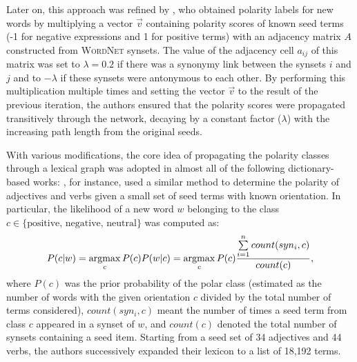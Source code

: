 Later on, this approach was refined by \citet{Blair-Goldensohn:08},
who obtained polarity labels for new words by multiplying a vector
$\vec{v}$ containing polarity scores of known seed terms (-1 for
negative expressions and 1 for positive terms) with an adjacency
matrix $A$ constructed from \textsc{WordNet} synsets.  The value of
the adjacency cell $a_{ij}$ of this matrix was set to $\lambda=0.2$ if
there was a synonymy link between the synsets $i$ and $j$ and to
$-\lambda$ if these synsets were antonymous to each other.  By
performing this multiplication multiple times and setting the vector
$\vec{v}$ to the result of the previous iteration, the authors ensured
that the polarity scores were propagated transitively through the
network, decaying by a constant factor ($\lambda$) with the increasing
path length from the original
seeds.%

With various modifications, the core idea of propagating the polarity
classes through a lexical graph was adopted in almost all of the
following dictionary-based works: \citet{Kim:04,Kim:06}, for instance,
used a similar method to determine the polarity of adjectives and
verbs given a small set of seed terms with known orientation.  In
particular, the likelihood of a new word $w$ belonging to the class $c
\in \{\textrm{positive, negative, neutral}\}$ was computed as:
\begin{equation*}
  P(c|w) = \argmax_{c}P(c)P(w|c) = \argmax_{c}P(c)\frac{\sum\limits_{i=1}^{n}count(syn_i, c)}{count(c)},
\end{equation*}
where $P(c)$ was the prior probability of the polar class (estimated
as the number of words with the given orientation $c$ divided by the
total number of terms considered), $count(syn_i, c)$ meant the number
of times a seed term from class $c$ appeared in a synset of $w$, and
$count(c)$ denoted the total number of synsets containing a seed item.
Starting from a seed set of 34 adjectives and 44 verbs, the authors
successively expanded their lexicon to a list of 18,192 terms. %

